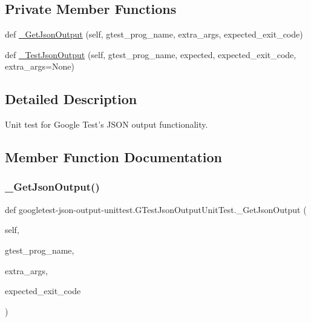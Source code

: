 \subsection*{Private Member Functions}
\begin{DoxyCompactItemize}
\item 
def \mbox{\hyperlink{classgoogletest-json-output-unittest_1_1_g_test_json_output_unit_test_aba4f4e2702b683350de508ec5eaaab55}{\+\_\+\+Get\+Json\+Output}} (self, gtest\+\_\+prog\+\_\+name, extra\+\_\+args, expected\+\_\+exit\+\_\+code)
\item 
def \mbox{\hyperlink{classgoogletest-json-output-unittest_1_1_g_test_json_output_unit_test_a0145de3211dd5d9e50aa23c8ae9fde5e}{\+\_\+\+Test\+Json\+Output}} (self, gtest\+\_\+prog\+\_\+name, expected, expected\+\_\+exit\+\_\+code, extra\+\_\+args=None)
\end{DoxyCompactItemize}


\subsection{Detailed Description}
\begin{DoxyVerb}Unit test for Google Test's JSON output functionality.
\end{DoxyVerb}
 

\subsection{Member Function Documentation}
\mbox{\label{classgoogletest-json-output-unittest_1_1_g_test_json_output_unit_test_aba4f4e2702b683350de508ec5eaaab55}} 
\subsubsection{\texorpdfstring{\_GetJsonOutput()}{\_GetJsonOutput()}}
{\footnotesize\ttfamily def googletest-\/json-\/output-\/unittest.\+G\+Test\+Json\+Output\+Unit\+Test.\+\_\+\+Get\+Json\+Output (\begin{DoxyParamCaption}\item[{}]{self,  }\item[{}]{gtest\+\_\+prog\+\_\+name,  }\item[{}]{extra\+\_\+args,  }\item[{}]{expected\+\_\+exit\+\_\+code }\end{DoxyParamCaption})\hspace{0.3cm}{\ttfamily [private]}}

